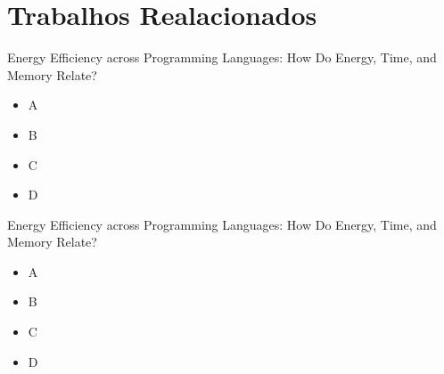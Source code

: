 \section{Trabalhos Realacionados}

\begin{frame}{Energy Efficiency across Programming Languages: How
    Do Energy, Time, and Memory Relate?}
    \begin{itemize}
        \item A
        \item B
        \item C 
        \item D 
    \end{itemize}
\end{frame}

\begin{frame}{Energy Efficiency across Programming Languages: How
    Do Energy, Time, and Memory Relate?}
    \begin{itemize}
        \item A
        \item B
        \item C 
        \item D 
    \end{itemize}
\end{frame}

